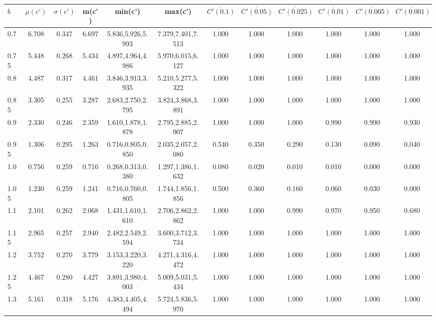 \begin{table*}[h!]
\begin{center}
\begin{tabular}{| l | c | c | c | c | c | c | c | c | c | c | c |}\hline
$b$ & $\mu(c')$ & $\sigma(c')$ & m(c') & min(c') & max(c') & $\overline{C'(0.1)}$ & $\overline{C'(0.05)}$ & $\overline{C'(0.025)}$ & $\overline{C'(0.01)}$ & $\overline{C'(0.005)}$ & $\overline{C'(0.001)}$ \\\hline
0.7 & 6.708 & 0.347 & 6.697 & 5.836,5.926,5.993 & 7.379,7.401,7.513  & 1.000  & 1.000  & 1.000  & 1.000  & 1.000  & 1.000 \\\hline
0.75 & 5.448 & 0.268 & 5.434 & 4.897,4.964,4.986 & 5.970,6.015,6.127  & 1.000  & 1.000  & 1.000  & 1.000  & 1.000  & 1.000 \\\hline
0.8 & 4.487 & 0.317 & 4.461 & 3.846,3.913,3.935 & 5.210,5.277,5.322  & 1.000  & 1.000  & 1.000  & 1.000  & 1.000  & 1.000 \\\hline
0.85 & 3.305 & 0.255 & 3.287 & 2.683,2.750,2.795 & 3.824,3.868,3.891  & 1.000  & 1.000  & 1.000  & 1.000  & 1.000  & 1.000 \\\hline
0.9 & 2.330 & 0.246 & 2.359 & 1.610,1.878,1.878 & 2.795,2.885,2.907  & 1.000  & 1.000  & 1.000  & 0.990  & 0.990  & 0.930 \\\hline
0.95 & 1.306 & 0.295 & 1.263 & 0.716,0.805,0.850 & 2.035,2.057,2.080  & 0.540  & 0.350  & 0.290  & 0.130  & 0.090  & 0.040 \\\hline
1.0 & 0.756 & 0.259 & 0.716 & 0.268,0.313,0.380 & 1.297,1.386,1.632  & 0.080  & 0.020  & 0.010  & 0.010  & 0.000  & 0.000 \\\hline
1.05 & 1.230 & 0.259 & 1.241 & 0.716,0.760,0.805 & 1.744,1.856,1.856  & 0.500  & 0.360  & 0.160  & 0.060  & 0.030  & 0.000 \\\hline
1.1 & 2.101 & 0.262 & 2.068 & 1.431,1.610,1.610 & 2.706,2.862,2.862  & 1.000  & 1.000  & 0.990  & 0.970  & 0.950  & 0.680 \\\hline
1.15 & 2.965 & 0.257 & 2.940 & 2.482,2.549,2.594 & 3.600,3.712,3.734  & 1.000  & 1.000  & 1.000  & 1.000  & 1.000  & 1.000 \\\hline
1.2 & 3.752 & 0.270 & 3.779 & 3.153,3.220,3.220 & 4.271,4.316,4.472  & 1.000  & 1.000  & 1.000  & 1.000  & 1.000  & 1.000 \\\hline
1.25 & 4.467 & 0.280 & 4.427 & 3.891,3.980,4.003 & 5.009,5.031,5.434  & 1.000  & 1.000  & 1.000  & 1.000  & 1.000  & 1.000 \\\hline
1.3 & 5.161 & 0.318 & 5.176 & 4.383,4.405,4.494 & 5.724,5.836,5.970  & 1.000  & 1.000  & 1.000  & 1.000  & 1.000  & 1.000 \\\hline

\end{tabular}
\end{center}
\end{table*}
